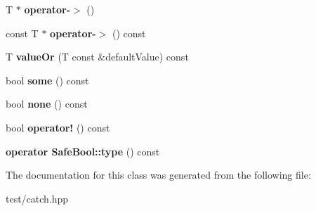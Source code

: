 \begin{DoxyCompactItemize}
\item 
T $\ast$ {\bfseries operator-\/$>$} ()\hypertarget{classCatch_1_1Option_acad340798a16c8f700f8763119e90f31}{}\label{classCatch_1_1Option_acad340798a16c8f700f8763119e90f31}

\item 
const T $\ast$ {\bfseries operator-\/$>$} () const \hypertarget{classCatch_1_1Option_a0800340b2971748671b88acfb14bb928}{}\label{classCatch_1_1Option_a0800340b2971748671b88acfb14bb928}

\item 
T {\bfseries value\+Or} (T const \&default\+Value) const \hypertarget{classCatch_1_1Option_a21b5629a7febbe3e23c475c9d9138a2d}{}\label{classCatch_1_1Option_a21b5629a7febbe3e23c475c9d9138a2d}

\item 
bool {\bfseries some} () const \hypertarget{classCatch_1_1Option_affa96f15798b4656fb753ff52d12dec2}{}\label{classCatch_1_1Option_affa96f15798b4656fb753ff52d12dec2}

\item 
bool {\bfseries none} () const \hypertarget{classCatch_1_1Option_a389324d2aa20ceb0eb0f48a5f77c20c8}{}\label{classCatch_1_1Option_a389324d2aa20ceb0eb0f48a5f77c20c8}

\item 
bool {\bfseries operator!} () const \hypertarget{classCatch_1_1Option_a47a1b6f6def2730ea9d27a1860a4f97f}{}\label{classCatch_1_1Option_a47a1b6f6def2730ea9d27a1860a4f97f}

\item 
{\bfseries operator Safe\+Bool\+::type} () const \hypertarget{classCatch_1_1Option_a637d4366ae7f0ded52ce59c8cb06da7b}{}\label{classCatch_1_1Option_a637d4366ae7f0ded52ce59c8cb06da7b}

\end{DoxyCompactItemize}


The documentation for this class was generated from the following file\+:\begin{DoxyCompactItemize}
\item 
test/catch.\+hpp\end{DoxyCompactItemize}
